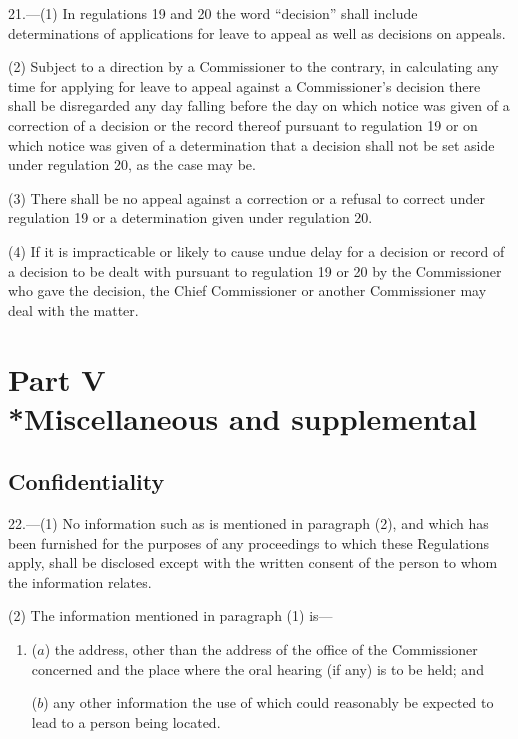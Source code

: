 \documentclass[a4paper]{article}
\newcommand{\parthead}{}
\begin{document}
21.—(1) In regulations 19 and 20 the word “decision” shall include determinations of applications for leave to appeal as well as decisions on appeals.

(2) Subject to a direction by a Commissioner to the contrary, in calculating any time for applying for leave to appeal against a Commissioner’s decision there shall be disregarded any day falling before the day on which notice was given of a correction of a decision or the record thereof pursuant to regulation 19 or on which notice was given of a determination that a decision shall not be set aside under regulation 20, as the case may be.

(3) There shall be no appeal against a correction or a refusal to correct under regulation 19 or a determination given under regulation 20.

(4) If it is impracticable or likely to cause undue delay for a decision or record of a decision to be dealt with pursuant to regulation 19 or 20 by the Commissioner who gave the decision, the Chief Commissioner or another Commissioner may deal with the matter.

\section[Part V --- Miscellaneous and supplemental]{Part V\\*Miscellaneous and supplemental}

\renewcommand\parthead{--- Part V}

\subsection[22. Confidentiality]{Confidentiality}

22.—(1) No information such as is mentioned in paragraph (2), and which has been furnished for the purposes of any proceedings to which these Regulations apply, shall be disclosed except with the written consent of the person to whom the information relates.

(2) The information mentioned in paragraph (1) is—
\begin{enumerate}\item[]
($a$) the address, other than the address of the office of the Commissioner concerned and the place where the oral hearing (if any) is to be held; and

($b$) any other information the use of which could reasonably be expected to lead to a person being located.
\end{enumerate}
\end{document}
